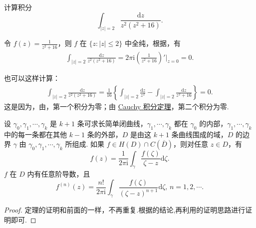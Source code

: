 \documentclass[../../main.tex]{subfiles}
\begin{document}
\begin{example}
计算积分
\[
\int_{|z| = 2} \frac{\mathrm{d}z}{z^2(z^2 + 16)}.
\]
\end{example}
\begin{solution}
令 \( f(z) = \frac{1}{z^2 + 16} \)，则 \( f \) 在 \( \{z: |z| \leqslant 2\} \) 中全纯，根据，有
\begin{align*}
\int_{|z| = 2} \frac{\mathrm{d}z}{z^2(z^2 + 16)} = 2\pi \mathrm{i} \left( \frac{1}{z^2 + 16} \right)' \bigg|_{z = 0} = 0.
\end{align*}

也可以这样计算：
\begin{align*}
\int_{|z| = 2} \frac{\mathrm{d}z}{z^2(z^2 + 16)} = \frac{1}{16} \left\{ \int_{|z| = 2} \frac{\mathrm{d}z}{z^2} - \int_{|z| = 2} \frac{\mathrm{d}z}{z^2 + 16} \right\} = 0.
\end{align*}
这是因为，由，第一个积分为零；由 \hyperref[theorem:Cauchy-Goursat定理(Cauchy积分定理)]{Cauchy 积分定理}，第二个积分为零. 
\end{solution}

\begin{theorem}\label{theorem:定理3.4.6}
设 \( \gamma_0, \gamma_1, \cdots, \gamma_k \) 是 \( k + 1 \) 条可求长简单闭曲线，\( \gamma_1, \cdots, \gamma_k \) 都在 \( \gamma_0 \) 的内部，\( \gamma_1, \cdots, \gamma_k \) 中的每一条都在其他 \( k - 1 \) 条的外部，\( D \) 是由这 \( k + 1 \) 条曲线围成的域，\( D \) 的边界 \( \gamma \) 由 \( \gamma_0, \gamma_1, \cdots, \gamma_k \) 所组成. 如果 \( f \in H(D) \cap C(\overline{D}) \)，则对任意 \( z \in D \)，有
\[
f(z) = \frac{1}{2\pi \mathrm{i}} \int_{\gamma} \frac{f(\zeta)}{\zeta - z} \mathrm{d}\zeta.
\]
\( f \) 在 \( D \) 内有任意阶导数，且
\[
f^{(n)}(z) = \frac{n!}{2\pi \mathrm{i}} \int_{\gamma} \frac{f(\zeta)}{(\zeta - z)^{n + 1}} \mathrm{d}\zeta, \, n = 1, 2, \cdots.
\]
\end{theorem}
\begin{proof}
定理的证明和前面的一样，不再重复.根据的结论,再利用的证明思路进行证明即可.
\end{proof}
\end{document}
